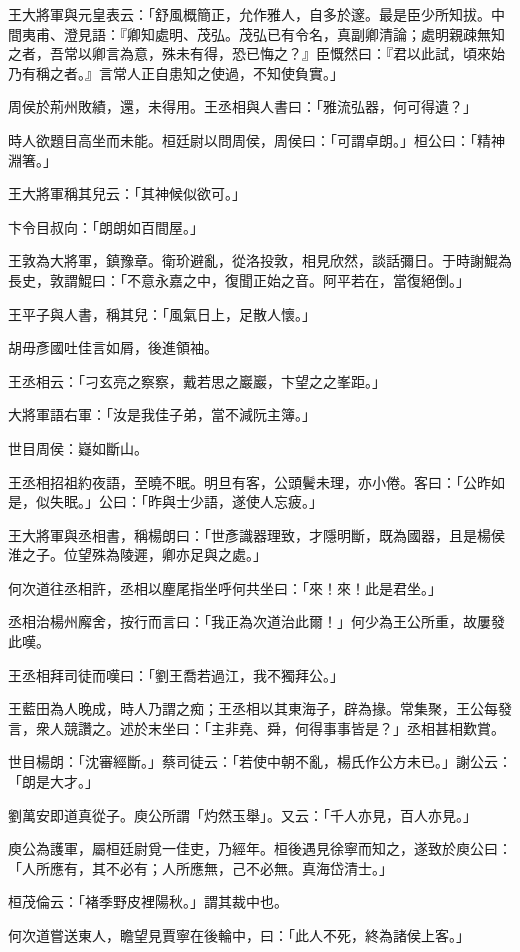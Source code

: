 王大將軍與元皇表云：「舒風概簡正，允作雅人，自多於邃。最是臣少所知拔。中間夷甫、澄見語：『卿知處明、茂弘。茂弘已有令名，真副卿清論；處明親疎無知之者，吾常以卿言為意，殊未有得，恐已悔之？』臣慨然曰：『君以此試，頃來始乃有稱之者。』言常人正自患知之使過，不知使負實。」

周侯於荊州敗績，還，未得用。王丞相與人書曰：「雅流弘器，何可得遺？」

時人欲題目高坐而未能。桓廷尉以問周侯，周侯曰：「可謂卓朗。」桓公曰：「精神淵箸。」

王大將軍稱其兒云：「其神候似欲可。」

卞令目叔向：「朗朗如百間屋。」

王敦為大將軍，鎮豫章。衛玠避亂，從洛投敦，相見欣然，談話彌日。于時謝鯤為長史，敦謂鯤曰：「不意永嘉之中，復聞正始之音。阿平若在，當復絕倒。」

王平子與人書，稱其兒：「風氣日上，足散人懷。」

胡毋彥國吐佳言如屑，後進領袖。

王丞相云：「刁玄亮之察察，戴若思之巖巖，卞望之之峯距。」

大將軍語右軍：「汝是我佳子弟，當不減阮主簿。」

世目周侯：嶷如斷山。

王丞相招祖約夜語，至曉不眠。明旦有客，公頭鬢未理，亦小倦。客曰：「公昨如是，似失眠。」公曰：「昨與士少語，遂使人忘疲。」

王大將軍與丞相書，稱楊朗曰：「世彥識器理致，才隱明斷，既為國器，且是楊侯淮之子。位望殊為陵遲，卿亦足與之處。」

何次道往丞相許，丞相以麈尾指坐呼何共坐曰：「來！來！此是君坐。」

丞相治楊州廨舍，按行而言曰：「我正為次道治此爾！」何少為王公所重，故屢發此嘆。

王丞相拜司徒而嘆曰：「劉王喬若過江，我不獨拜公。」

王藍田為人晚成，時人乃謂之痴；王丞相以其東海子，辟為掾。常集聚，王公每發言，衆人競讚之。述於末坐曰：「主非堯、舜，何得事事皆是？」丞相甚相歎賞。

世目楊朗：「沈審經斷。」蔡司徒云：「若使中朝不亂，楊氏作公方未已。」謝公云：「朗是大才。」

劉萬安即道真從子。庾公所謂「灼然玉舉」。又云：「千人亦見，百人亦見。」

庾公為護軍，屬桓廷尉覓一佳吏，乃經年。桓後遇見徐寧而知之，遂致於庾公曰：「人所應有，其不必有；人所應無，己不必無。真海岱清士。」

桓茂倫云：「褚季野皮裡陽秋。」謂其裁中也。

何次道嘗送東人，瞻望見賈寧在後輪中，曰：「此人不死，終為諸侯上客。」

